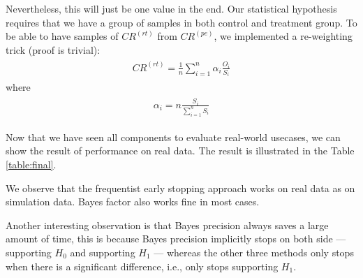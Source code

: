 \documentclass[paper=a4, fontsize=11pt]{scrartcl} %
\numberwithin{equation}{section} %
\numberwithin{figure}{section} %
\numberwithin{table}{section} %
\begin{document}
Nevertheless, this will just be one value in the end. Our statistical hypothesis requires that we have a group of samples in both control and treatment group.
To be able to have samples of $CR^{(rt)}$ from $CR^{(pe)}$, we implemented a re-weighting trick (proof is trivial):
\begin{align} 
\begin{split}
CR^{(rt)} = \frac{1}{n} \sum_{i=1}^{n} \alpha_i \frac{O_i}{S_i}
\end{split}					
\end{align}
where
\begin{align} 
\begin{split}
\alpha_i  = n \frac{S_i}{\sum_{i=1}^{n} S_i}
\end{split}					
\end{align}

Now that we have seen all components to evaluate real-world usecases, we can show the result of performance on real data. The result is illustrated in the Table \ref{table:final}.

We observe that the frequentist early stopping approach works on real data as on simulation data. Bayes factor also works fine in most cases.

Another interesting observation is that Bayes precision always saves a large amount of time, this is because Bayes precision implicitly stops on both side --- supporting $H_0$ and supporting $H_1$ --- whereas the other three methods only stops when there is a significant difference, i.e., only stops supporting $H_1$.
\end{document}
